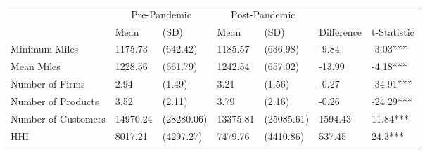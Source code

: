 
\begin{tabular}[t]{lllllll}
\toprule
\multicolumn{1}{c}{ } & \multicolumn{2}{c}{Pre-Pandemic} & \multicolumn{2}{c}{Post-Pandemic} & \multicolumn{2}{c}{ } \\
\cmidrule(l{3pt}r{3pt}){2-3} \cmidrule(l{3pt}r{3pt}){4-5}
 & Mean & (SD) & Mean & (SD) & Difference & t-Statistic\\
\midrule
Minimum Miles & 1175.73 & (642.42) & 1185.57 & (636.98) & -9.84 & -3.03***\\
Mean Miles & 1228.56 & (661.79) & 1242.54 & (657.02) & -13.99 & -4.18***\\
Number of Firms & 2.94 & (1.49) & 3.21 & (1.56) & -0.27 & -34.91***\\
Number of Products & 3.52 & (2.11) & 3.79 & (2.16) & -0.26 & -24.29***\\
Number of Customers & 14970.24 & (28280.06) & 13375.81 & (25085.61) & 1594.43 & 11.84***\\
HHI & 8017.21 & (4297.27) & 7479.76 & (4410.86) & 537.45 & 24.3***\\
\bottomrule
\end{tabular}
